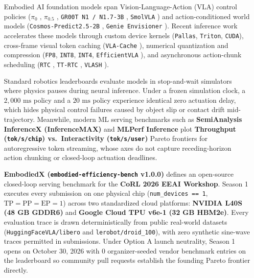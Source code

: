 \documentclass[10pt,letterpaper]{article}
\begin{document}
Embodied AI foundation models span Vision-Language-Action (VLA) control policies ($\pi_0$ \cite{Black2024pi0}, $\pi_{0.5}$ \cite{PhysicalIntelligence2025pi05}, \texttt{GR00T N1 / N1.7-3B} \cite{Bjorck2025gr00t}, \texttt{SmolVLA} \cite{Shukor2025smolvla}) and action-conditioned world models (\texttt{Cosmos-Predict2.5-2B} \cite{NVIDIA2025cosmos}, \texttt{Genie Envisioner} \cite{Liao2025genie}). Recent inference work accelerates these models through custom device kernels (\texttt{Pallas}, \texttt{Triton}, \texttt{CUDA}), cross-frame visual token caching (\texttt{VLA-Cache} \cite{Xu2025vlacache}), numerical quantization and compression (\texttt{FP8}, \texttt{INT8}, \texttt{INT4}, \texttt{EfficientVLA} \cite{Yang2025efficientvla,Guan2025efficient,Yu2025survey}), and asynchronous action-chunk scheduling (\texttt{RTC} \cite{Black2025realtime}, \texttt{TT-RTC} \cite{Black2025trainingtime}, \texttt{VLASH} \cite{Tang2025vlash}).

Standard robotics leaderboards evaluate models in stop-and-wait simulators where physics pauses during neural inference. Under a frozen simulation clock, a $2{,}000\text{ ms}$ policy and a $20\text{ ms}$ policy experience identical zero actuation delay, which hides physical control failures caused by object slip or contact drift mid-trajectory. Meanwhile, modern ML serving benchmarks such as \textbf{SemiAnalysis InferenceX (InferenceMAX)} \cite{Patel2025inferencemax,Patel2026inferencexv2} and \textbf{MLPerf Inference} \cite{Reddi2020mlperf} plot \textbf{Throughput (\texttt{tok/s/chip}) vs.\ Interactivity (\texttt{tok/s/user})} Pareto frontiers for autoregressive token streaming, whose axes do not capture receding-horizon action chunking or closed-loop actuation deadlines.

\textbf{EmbodiedX (\texttt{embodied-efficiency-bench} v1.0.0)} defines an open-source closed-loop serving benchmark for the \textbf{CoRL 2026 EEAI Workshop}. Season 1 executes every submission on one physical chip (\texttt{num\_devices == 1}, $\text{TP} = \text{PP} = \text{EP} = 1$) across two standardized cloud platforms: \textbf{NVIDIA L40S (48 GB GDDR6)} and \textbf{Google Cloud TPU v6e-1 (32 GB HBM2e)}. Every evaluation trace is drawn deterministically from public real-world datasets (\texttt{HuggingFaceVLA/libero} and \texttt{lerobot/droid\_100}), with zero synthetic sine-wave traces permitted in submissions. Under Option A launch neutrality, Season 1 opens on October 30, 2026 with $0$ organizer-seeded vendor benchmark entries on the leaderboard so community pull requests establish the founding Pareto frontier directly.
\end{document}
